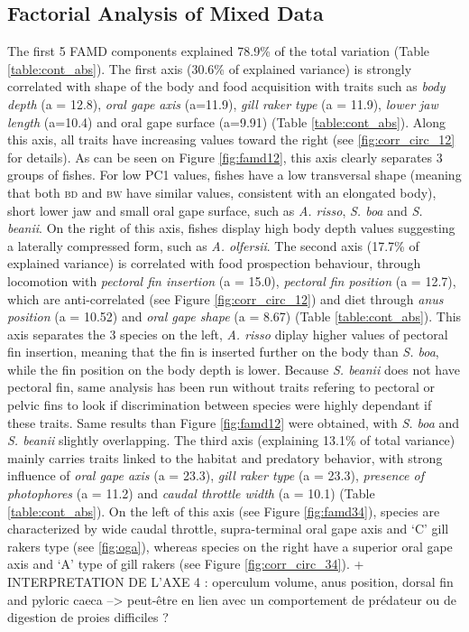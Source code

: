 
\subsection{Factorial Analysis of Mixed Data}

The first 5 FAMD components explained 78.9\% of the total variation (Table \ref{table:cont_abs}). The first axis (30.6\% of explained variance) is strongly correlated with shape of the body and food acquisition with traits such as \emph{body depth} (a = 12.8), \emph{oral gape axis} (a=11.9), \emph{gill raker type} (a = 11.9), \emph{lower jaw length} (a=10.4) and oral gape surface (a=9.91) (Table \ref{table:cont_abs}). Along this axis, all traits have increasing values toward the right (see \ref{fig:corr_circ_12} for details). As can be seen on Figure \ref{fig:famd12}, this axis clearly separates 3 groups of fishes. For low PC1 values, fishes have a low transversal shape (meaning that both \textsc{bd} and \textsc{bw} have similar values, consistent with an elongated body), short lower jaw and small oral gape surface, such as \textit{A. risso}, \textit{S. boa} and \textit{S. beanii}. On the right of this axis, fishes display high body depth values suggesting a laterally compressed form, such as \textit{A. olfersii}. 
The second axis (17.7\% of explained variance) is correlated with food prospection behaviour, through locomotion with \emph{pectoral fin insertion} (a = 15.0), \emph{pectoral fin position} (a = 12.7), which are anti-correlated (see Figure \ref{fig:corr_circ_12}) and diet through \emph{anus position} (a = 10.52) and \emph{oral gape shape} (a = 8.67) (Table \ref{table:cont_abs}). This axis separates the 3 species on the left, \textit{A. risso} diplay higher values of pectoral fin insertion, meaning that the fin is inserted further on the body than \textit{S. boa}, while the fin position on the body depth is lower. Because \textit{S. beanii} does not have pectoral fin, same analysis has been run without traits refering to pectoral or pelvic fins to look if discrimination between species were highly dependant if these traits. Same results than Figure \ref{fig:famd12} were obtained, with \textit{S. boa} and \textit{S. beanii} slightly overlapping. 
The third axis (explaining 13.1\% of total variance) mainly carries traits linked to the habitat and predatory behavior, with strong influence of \emph{oral gape axis} (a = 23.3), \emph{gill raker type} (a = 23.3), \emph{presence of photophores} (a = 11.2) and \emph{caudal throttle width} (a = 10.1) (Table \ref{table:cont_abs}). On the left of this axis (see Figure \ref{fig:famd34}), species are characterized by wide caudal throttle, supra-terminal oral gape axis and `C' gill rakers type (see \ref{fig:oga}), whereas species on the right have a superior oral gape axis and `A' type of gill rakers (see Figure \ref{fig:corr_circ_34}).
+ INTERPRETATION DE L'AXE 4 : operculum volume, anus position, dorsal fin and pyloric caeca --> peut-être en lien avec un comportement de prédateur ou de digestion de proies difficiles ?  

